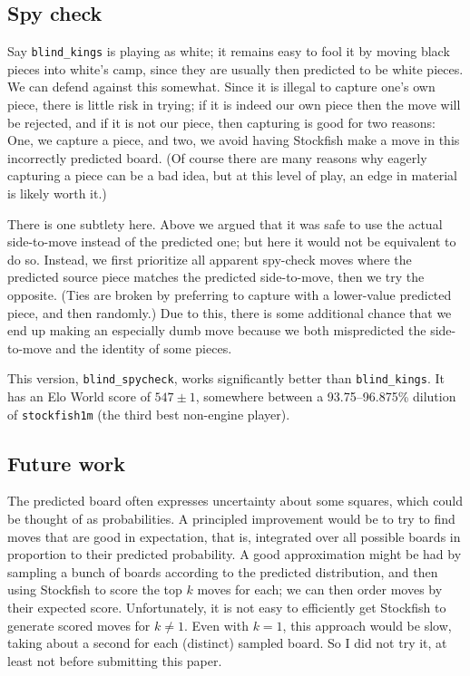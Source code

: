 \documentclass[twocolumn]{amsart}
\begin{document}
\subsection{Spy check} \label{sec:spycheck}

Say \verb+blind_kings+ is playing as white; it remains easy to fool it
by moving black pieces into white's camp, since they are usually then
predicted to be white pieces. We can defend against this somewhat.
Since it is illegal to capture one's own piece, there is little risk
in trying; if it is indeed our own piece then the move will be
rejected, and if it is not our piece, then capturing is good for two
reasons: One, we capture a piece, and two, we avoid having
Stockfish make a move in this incorrectly predicted board. (Of course
there are many reasons why eagerly capturing a piece can be a bad
idea, but at this level of play, an edge in material is likely worth
it.)

There is one subtlety here. Above we argued that it was safe to use
the actual side-to-move instead of the predicted one; but here it
would not be equivalent to do so. Instead, we first prioritize all
apparent spy-check moves where the predicted source piece matches the
predicted side-to-move, then we try the opposite. (Ties are broken by
preferring to capture with a lower-value predicted piece, and then
randomly.) Due to this, there is some additional chance that we end up
making an especially dumb move because we both mispredicted the
side-to-move and the identity of some pieces.

This version, \verb+blind_spycheck+, works significantly better than
\verb+blind_kings+. It has an Elo World score of $547 \pm 1$, somewhere
between a 93.75--96.875\% dilution of \verb+stockfish1m+ (the third
best non-engine player).

\subsection{Future work}

The predicted board often expresses uncertainty about some squares,
which could be thought of as probabilities. A principled improvement
would be to try to find moves that are good in expectation, that is,
integrated over all possible boards in proportion to their predicted
probability. A good approximation might be had by sampling a bunch of
boards according to the predicted distribution, and then using
Stockfish to score the top $k$ moves for each; we can then order moves
by their expected score. Unfortunately, it is not easy to efficiently
get Stockfish to generate scored moves for $k \neq 1$. Even with $k =
1$, this approach would be slow, taking about a second for each
(distinct) sampled board. So I did not try it, at least not before
submitting this paper.
\end{document}
